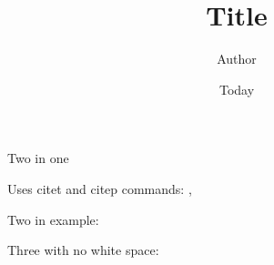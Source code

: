 \documentclass[]{article}
\begin{document}
\title{Title}
\author{Author}
\date{Today}
\maketitle

Two in one \citep{Safak:1992ub, Chatzigogos:2008uv}

Uses citet and citep commands: \citep[e.g.][]{Raychowdhury:2009hw},

Two in example: \citep[e.g.][]{NIST:2013ssi, Vesic:1975}

Three with no white space: \citep[e.g.][]{Taylor:1979uc, Gajan:2008cs,Deng:2012ta}
\end{document}
